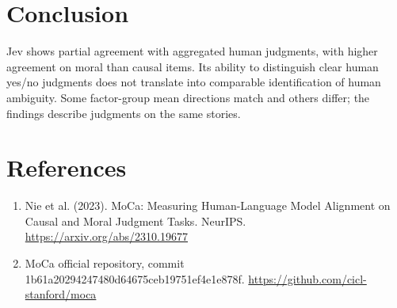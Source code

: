 \documentclass[10pt,a4paper]{article}
\begin{document}
\section{Conclusion}
Jev shows partial agreement with aggregated human judgments, with higher agreement on moral than causal items. Its ability to distinguish clear human yes/no judgments does not translate into comparable identification of human ambiguity. Some factor-group mean directions match and others differ; the findings describe judgments on the same stories.
\section*{References}
\begin{enumerate}
\item Nie et al. (2023). MoCa: Measuring Human-Language Model Alignment on Causal and Moral Judgment Tasks. NeurIPS. \url{https://arxiv.org/abs/2310.19677}
\item MoCa official repository, commit 1b61a20294247480d64675ceb19751ef4e1e878f. \url{https://github.com/cicl-stanford/moca}
\end{enumerate}
\end{document}
